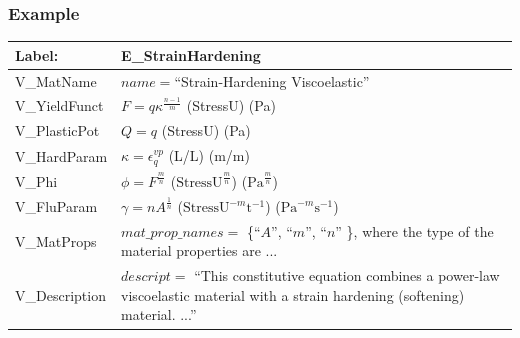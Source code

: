 \documentclass[t,12pt,numbers,fleqn]{beamer}
\begin{document}
\begin{frame}

\frametitle{Example}

\begin{minipage}{\textwidth}
\begin{tabular}{| p{} | p{}|}
\hline
\rowcolor[gray]{0.9}
Label: & E\_StrainHardening\\ \hline
{V\_MatName} & $\mathit{name = }$``Strain-Hardening Viscoelastic''\\
\hline
{V\_YieldFunct} & $F =  q \kappa^{\frac{n-1}{m}}$ (StressU) (Pa)\\ \hline
{V\_PlasticPot} & $Q = q$ (StressU) (Pa)\\ \hline 
{V\_HardParam} & $\kappa = \epsilon_q^{\mathit{vp}}$ (L/L) (m/m)\\
\hline
{V\_Phi} & $\phi = F^{\frac{m}{n}}$ ($\mbox{StressU}^{\frac{m}{n}}$) ($\mbox{Pa}^{\frac{m}{n}}$)\\
\hline
{V\_FluParam} & $\gamma = n A^{\frac{1}{n}}$ ($\mbox{StressU}^{-m} \mbox{t}^{-1}$) ($\mbox{Pa}^{-m} \mbox{s}^{-1}$)\\ \hline
{V\_MatProps} & $\mathit{mat\_prop\_names} = $ \{``$A$'', ``$m$'', ``$n$'' \}, where the type of the
material properties are ...\\
\hline
{V\_Description} & $\mathit{descript =}$ ``This constitutive equation combines a power-law viscoelastic
material with a strain hardening (softening) material.  ...''
\\ \hline
\end{tabular}
\end{minipage}

\end{frame}

\end{document}
